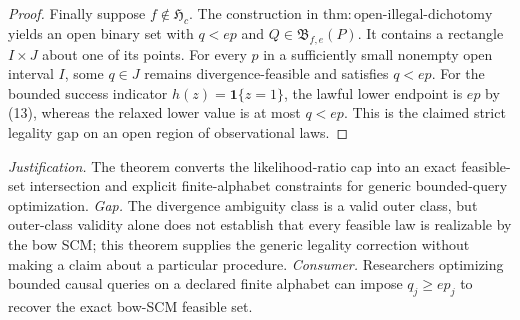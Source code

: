 \documentclass{article}
\begin{document}
\begin{proof}
Finally suppose \(f\notin\mathfrak H_c\).  The construction in \(\mathrm{thm:open\text{-}illegal\text{-}dichotomy}\) yields an open binary set with \(q<ep\) and \(Q\in\mathfrak B_{f,e}(P)\).  It contains a rectangle \(I\times J\) about one of its points.  For every \(p\) in a sufficiently small nonempty open interval \(I\), some \(q\in J\) remains divergence-feasible and satisfies \(q<ep\).  For the bounded success indicator \(h(z)=\mathbf 1\{z=1\}\), the lawful lower endpoint is \(ep\) by (13), whereas the relaxed lower value is at most \(q<ep\).  This is the claimed strict legality gap on an open region of observational laws.
\end{proof}
\par\smallskip\noindent \textit{Justification.} The theorem converts the likelihood-ratio cap into an exact feasible-set intersection and explicit finite-alphabet constraints for generic bounded-query optimization. \textit{Gap.} The divergence ambiguity class is a valid outer class, but outer-class validity alone does not establish that every feasible law is realizable by the bow SCM; this theorem supplies the generic legality correction without making a claim about a particular procedure. \textit{Consumer.} Researchers optimizing bounded causal queries on a declared finite alphabet can impose \(q_j\ge ep_j\) to recover the exact bow-SCM feasible set.
\end{document}

